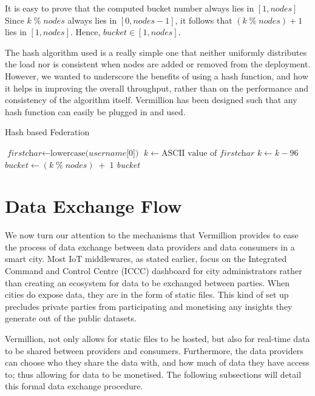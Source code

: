 \documentclass[conference, 10pt]{IEEEtran}
\begin{document}
It is easy to prove that the computed bucket number always lies in $[1,nodes]$ Since $k \; \% \; nodes$ always lies in $[0,nodes-1]$, it follows that $(k \; \% \; nodes) +1$ lies in $[1,nodes]$. Hence, $bucket \in [1,nodes]$.

The hash algorithm used is a really simple one that neither uniformly distributes the load nor is consistent when nodes are added or removed from the deployment. However, we wanted to underscore the benefits of using a hash function, and how it helps in improving the overall throughput, rather than on the performance and consistency of the algorithm itself. Vermillion has been designed such that any hash function can easily be plugged in and used.

\begin{algorithm}[H]
\caption{Hash based Federation}\label{hash}
\begin{algorithmic}[1]
\State $\textit{firstchar} \gets \text{lowercase(}\textit{username}\text{[0])}$
\State $k \gets \text{ASCII value of } \textit{firstchar}$
\State $k \gets k - 96$ 
\State $bucket \gets (k  \; \% \; nodes) \; + \; 1$  \label{mainline}
\State \Return \textit{bucket}
\EndProcedure
\end{algorithmic}
\end{algorithm}

\section{Data Exchange Flow}
We now turn our attention to the mechanisms that Vermillion provides to ease the process of data exchange between data providers and data consumers in a smart city. Most IoT middlewares, as stated earlier, focus on the Integrated Command and Control Centre (ICCC) dashboard for city administrators rather than creating an ecosystem for data to be exchanged between parties. When cities do expose data, they are in the form of static files. This kind of set up precludes private parties from participating and monetising any insights they generate out of the public datasets.

Vermillion, not only allows for static files to be hosted, but also for real-time data to be shared between providers and consumers. Furthermore, the data providers can choose who they share the data with, and how much of data they have access to; thus allowing for data to be monetised. The following subsections will detail this formal data exchange procedure.
\end{document}
